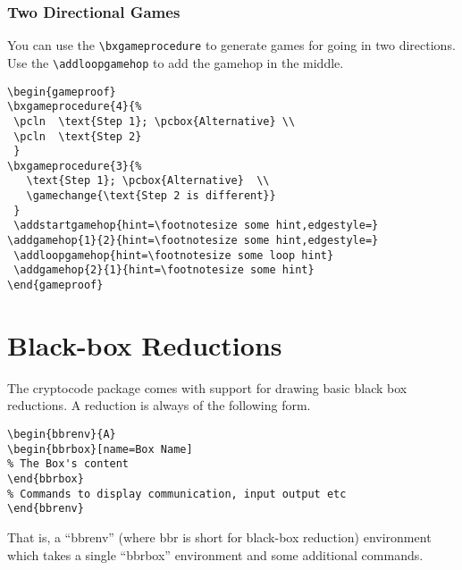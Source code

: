 \documentclass[a4paper]{report}
\begin{document}
\subsection{Two Directional Games}
You can use the \lstinline$\bxgameprocedure$ to generate games for going in two directions. Use the \lstinline$\addloopgamehop$
to add the gamehop in the middle.

\vspace{1cm}
\begin{center}
\begin{gameproof}
\end{gameproof}
\end{center}


\begin{lstlisting}
\begin{gameproof}
\bxgameprocedure{4}{%
 \pcln  \text{Step 1}; \pcbox{Alternative} \\
 \pcln  \text{Step 2}  
 }
\bxgameprocedure{3}{%
   \text{Step 1}; \pcbox{Alternative}  \\
   \gamechange{\text{Step 2 is different}}  
 }
 \addstartgamehop{hint=\footnotesize some hint,edgestyle=}
\addgamehop{1}{2}{hint=\footnotesize some hint,edgestyle=}
 \addloopgamehop{hint=\footnotesize some loop hint}
 \addgamehop{2}{1}{hint=\footnotesize some hint}
\end{gameproof}
\end{lstlisting}

\chapter{Black-box Reductions}
\label{chap:bbr}

The cryptocode package comes with support for drawing basic black box reductions. A reduction is
always of the following form.

\begin{lstlisting}
\begin{bbrenv}{A}
\begin{bbrbox}[name=Box Name]
% The Box's content
\end{bbrbox}
% Commands to display communication, input output etc
\end{bbrenv}
\end{lstlisting}
That is, a \enquote{bbrenv} (where bbr is short for black-box reduction) environment which takes a single
\enquote{bbrbox} environment and some additional commands. 
\end{document}
